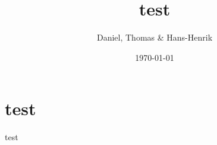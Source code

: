 \documentclass[a4paper, article, 11pt, oneside]{memoir}
\title{test}
\author{Daniel, Thomas \& Hans-Henrik}
\date{\today}
\begin{document}
\maketitle
\tableofcontents*
\newpage

\chapter{test}

test
\end{document}
